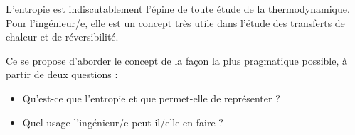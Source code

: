 L’entropie est indiscutablement l’épine de toute étude de la thermodynamique. Pour l’ingénieur/e, elle est un concept très utile dans l’étude des transferts de chaleur et de réversibilité.

Ce \courshuit se propose d’aborder le concept de la façon la plus pragmatique possible, à partir de deux questions :
\begin{itemize}
	\item Qu’est-ce que l’entropie et que permet-elle de représenter ?
	\item Quel usage l’ingénieur/e peut-il/elle en faire ?
\end{itemize}
